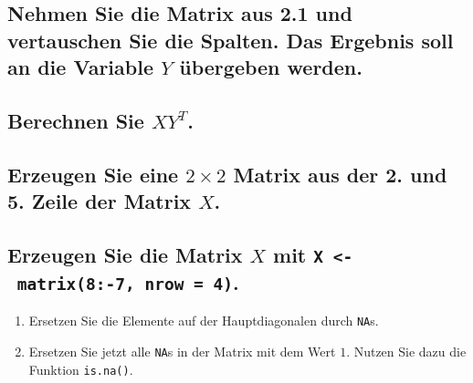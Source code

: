 \documentclass[12pt,a4paper]{article}
\begin{document}
\vspace{0.5cm}

\hypertarget{nehmen-sie-die-matrix-aus-2.1-und-vertauschen-sie-die-spalten.-das-ergebnis-soll-an-die-variable-y-uxfcbergeben-werden.}{%
\subsection{\texorpdfstring{Nehmen Sie die Matrix aus 2.1 und
vertauschen Sie die Spalten. Das Ergebnis soll an die Variable \(Y\)
übergeben
werden.}{Nehmen Sie die Matrix aus 2.1 und vertauschen Sie die Spalten. Das Ergebnis soll an die Variable Y übergeben werden.}}\label{nehmen-sie-die-matrix-aus-2.1-und-vertauschen-sie-die-spalten.-das-ergebnis-soll-an-die-variable-y-uxfcbergeben-werden.}}

\vspace{0.5cm}

\hypertarget{berechnen-sie-xyt.}{%
\subsection{\texorpdfstring{Berechnen Sie
\(XY^{T}\).}{Berechnen Sie XY\^{}\{T\}.}}\label{berechnen-sie-xyt.}}

\vspace{0.5cm}

\hypertarget{erzeugen-sie-eine-2-times-2-matrix-aus-der-2.-und-5.-zeile-der-matrix-x.}{%
\subsection{\texorpdfstring{Erzeugen Sie eine \(2 \times 2\) Matrix aus
der 2. und 5. Zeile der Matrix
\(X\).}{Erzeugen Sie eine 2 \textbackslash times 2 Matrix aus der 2. und 5. Zeile der Matrix X.}}\label{erzeugen-sie-eine-2-times-2-matrix-aus-der-2.-und-5.-zeile-der-matrix-x.}}

\vspace{0.5cm}

\hypertarget{erzeugen-sie-die-matrix-x-mit-x---matrix8-7-nrow-4.}{%
\subsection{\texorpdfstring{Erzeugen Sie die Matrix \(X\) mit
\texttt{X\ \textless{}-\ matrix(8:-7,\ nrow\ =\ 4)}.}{Erzeugen Sie die Matrix X mit X \textless- matrix(8:-7, nrow = 4).}}\label{erzeugen-sie-die-matrix-x-mit-x---matrix8-7-nrow-4.}}

\begin{enumerate}
\def\labelenumi{\arabic{enumi}.}
\item
  Ersetzen Sie die Elemente auf der Hauptdiagonalen durch \texttt{NA}s.
\item
  Ersetzen Sie jetzt alle \texttt{NA}s in der Matrix mit dem Wert \(1\).
  Nutzen Sie dazu die Funktion \texttt{is.na()}.
\end{enumerate}
\end{document}
